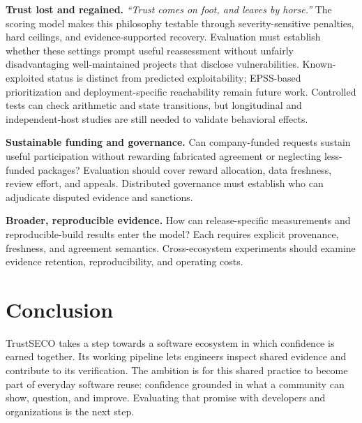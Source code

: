 \documentclass[10pt,conference]{IEEEtran}
\begin{document}
\textbf{Trust lost and regained.} \emph{``Trust comes on foot, and leaves by horse.''} The scoring model makes this philosophy testable through severity-sensitive penalties, hard ceilings, and evidence-supported recovery. Evaluation must establish whether these settings prompt useful reassessment without unfairly disadvantaging well-maintained projects that disclose vulnerabilities. Known-exploited status is distinct from predicted exploitability; EPSS-based prioritization and deployment-specific reachability remain future work. Controlled tests can check arithmetic and state transitions, but longitudinal and independent-host studies are still needed to validate behavioral effects.

\textbf{Sustainable funding and governance.} Can company-funded requests sustain useful participation without rewarding fabricated agreement or neglecting less-funded packages? Evaluation should cover reward allocation, data freshness, review effort, and appeals. Distributed governance must establish who can adjudicate disputed evidence and sanctions.

\textbf{Broader, reproducible evidence.} How can release-specific measurements and reproducible-build results enter the model? Each requires explicit provenance, freshness, and agreement semantics. Cross-ecosystem experiments should examine evidence retention, reproducibility, and operating costs.

\section{Conclusion}
TrustSECO takes a step towards a software ecosystem in which confidence is earned together. Its working pipeline lets engineers inspect shared evidence and contribute to its verification. The ambition is for this shared practice to become part of everyday software reuse: confidence grounded in what a community can show, question, and improve. Evaluating that promise with developers and organizations is the next step.



\end{document}
